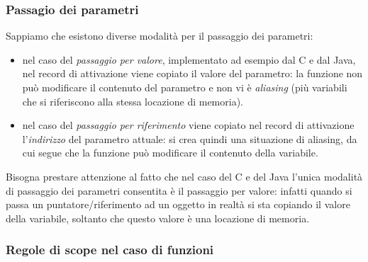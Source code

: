 \subsubsection*{Passagio dei parametri}
Sappiamo che esistono diverse modalità per il passaggio dei parametri:
\begin{itemize}
    \item nel caso del \emph{passaggio per valore}, implementato ad esempio dal C e dal Java, nel record di attivazione viene copiato il valore del parametro: la funzione non può modificare il contenuto del parametro e non vi è \emph{aliasing} (più variabili che si riferiscono alla stessa locazione di memoria).
    \item nel caso del \emph{passaggio per riferimento} viene copiato nel record di attivazione l'\emph{indirizzo} del parametro attuale: si crea quindi una situazione di aliasing, da cui segue che la funzione può modificare il contenuto della variabile.
\end{itemize}
Bisogna prestare attenzione al fatto che nel caso del C e del Java l'unica modalità di passaggio dei parametri consentita è il passaggio per valore: infatti quando si passa un puntatore/riferimento ad un oggetto in realtà si sta copiando il valore della variabile, soltanto che questo valore è una locazione di memoria.

\subsubsection*{Regole di scope nel caso di funzioni}

